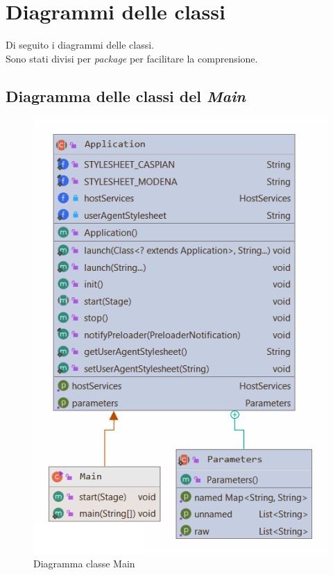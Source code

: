 \documentclass[a4paper,11pt]{report}
\begin{document}
\clearpage

\chapter{Diagrammi delle classi}\label{database}
Di seguito i diagrammi delle classi. \\Sono stati divisi per \textit{package} per facilitare la comprensione.

\section{Diagramma delle classi del \textit{Main}}
\begin{figure}[h!]
	\centering
	    \hspace*{-0.2in}
	\includegraphics[width=0.5\linewidth]{Class diagrams/Main.png}
	\caption{Diagramma classe Main}
\end{figure}

\clearpage
\end{document}
